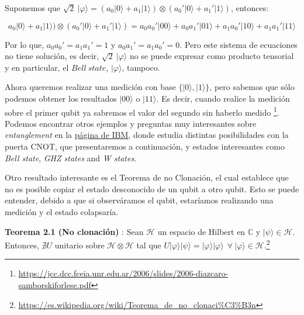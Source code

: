  \vspace{10pt}

 Suponemos que $\sqrt{2}\:|\varphi\rangle = (a_{0}|0\rangle+a_{1}|1\rangle) \otimes(a_{0}'|0\rangle+a_{1}'|1\rangle)$, entonces:
     
 \begin{equation}                             a_{0}|0\rangle+a_{1}|1\rangle)\otimes(a_{0}'|0\rangle+a_{1}'|1\rangle) =a_{0}a_{0}'|00\rangle + a_{0}a_{1}'|01\rangle + a_{1}a_{0}'|10\rangle + a_{1}a_{1}'|11\rangle
 \end{equation}
 
 \vspace{10pt}
 
 Por lo que, $a_{0}a_{0}'=a_{1}a_{1}'=1$ y $a_{0}a_{1}'=a_{1}a_{0}'=0$. Pero este sistema de ecuaciones no tiene solución, es decir, $\sqrt{2}\:|\varphi\rangle$ no se puede expresar como producto tensorial y en particular, el $Bell\:state$, $|\varphi\rangle$, tampoco.\newline
 
 Ahora queremos realizar una medición con base $\{|0\rangle,|1\rangle\}$, pero sabemos que sólo podemos obtener los resultados $|00\rangle$ o $|11\rangle$. Es decir, cuando realice la medición sobre el primer qubit ya sabremos el valor del segundo sin haberlo medido \footnote{\url{https://jcc.dcc.fceia.unr.edu.ar/2006/slides/2006-diazcaro-samborskiforlese.pdf}}. Podemos encontrar otros ejemplos y preguntas muy interesantes sobre \textit{entanglement} en la \href{https://quantum-computing.ibm.com/composer/docs/iqx/guide/entanglement}{página de IBM}, donde estudia distintas posibilidades con la puerta CNOT, que presentaremos a continuación, y estados interesantes como \textit{Bell state}, \textit{GHZ states} and \textit{W states}.\newline

 Otro resultado interesante es el Teorema de no Clonación, el cual establece que no es posible copiar el estado desconocido de un qubit a otro qubit. Esto se puede entender, debido a que si observáramos el qubit, estaríamos realizando una medición y el estado colapsaría.\newline

 \textbf{Teorema 2.1 (No clonación)} \cite{B:Nielsen:2002}: Sean $\mathcal{H}$ un espacio de Hilbert en $\mathbb{C}$ y $|\psi\rangle \in \mathcal{H}$. Entonces, $\nexists U$ unitario sobre $\mathcal{H}\otimes\mathcal{H}$ tal que $U|\varphi\rangle|\psi\rangle=|\varphi\rangle|\varphi\rangle\:\:\forall\:|\varphi\rangle\in\mathcal{H}$.\footnote{\url{https://es.wikipedia.org/wiki/Teorema_de_no_clonaci\%C3\%B3n}}


